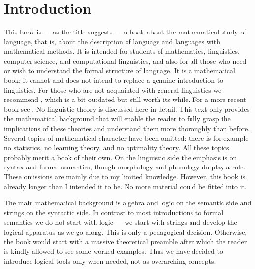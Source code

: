 \chapter*{Introduction}
%
%
%
This book is --- as the title suggests --- a book about
the mathematical study of language, that is, about the
description of language and languages with mathematical
methods. It is intended for students of mathematics,
linguistics, computer science, and computational linguistics,
and also for all those who need or wish to understand the
formal structure of language. It is a mathematical book; it 
cannot and does not intend to replace a genuine introduction
to linguistics. For those who are not acquainted with
general linguistics we recommend \cite{lyons:linguistik},
which is a bit outdated but still worth its while. For a more 
recent book see \cite{fromkin:introduction}. No linguistic 
theory is discussed here in detail. This text only provides the 
mathematical background that will enable the reader to fully 
grasp the implications of these theories and understand them 
more thoroughly than before. Several topics of mathematical 
character have been omitted: there is for example no statistics, 
no learning theory, and no optimality theory. All these 
topics probably merit a book of their own. On the linguistic 
side the emphasis is on syntax and formal semantics, though 
morphology and phonology do play a role. These omissions are 
mainly due to my limited knowledge. However, this book is 
already longer than I intended it to be. No more material 
could be fitted into it.

The main mathematical background is algebra and logic on
the semantic side and strings on the syntactic side. In
contrast to most introductions to formal semantics we do not
start with logic --- we start with strings and develop
the logical apparatus as we go along. This is only a
pedagogical decision. Otherwise, the book would start with
a massive theoretical preamble after which the reader is
kindly allowed to see some worked examples. Thus we have decided
to introduce logical tools only when needed, not as
overarching concepts.

